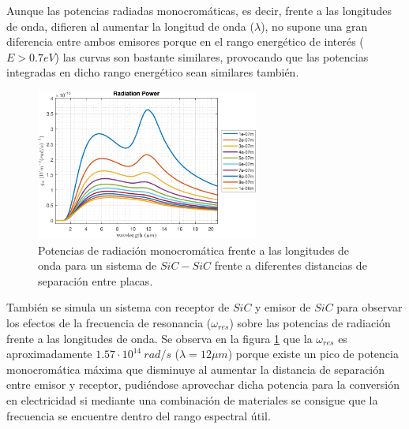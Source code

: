 Aunque las potencias radiadas monocromáticas, es decir, frente a las longitudes de onda, difieren al aumentar la longitud de onda ($\lambda$), no supone una gran diferencia entre ambos emisores porque en el rango energético de interés ($E>0.7eV$) las curvas son bastante similares, provocando que las potencias integradas en dicho rango energético sean similares también.
\begin{figure}[H]
	\centering
		\includegraphics[width=0.65\textwidth]{figuras/Resultados/radiacion/SiCSiC.pdf}
	\caption{Potencias de radiación monocromática frente a las longitudes de onda para un sistema de $SiC-SiC$ frente a diferentes distancias de separación entre placas.}
	\label{fig:SiCSiC}
\end{figure}
También se simula un sistema con receptor de $SiC$ y emisor de $SiC$ para observar los efectos de la frecuencia de resonancia ($\omega_{res}$) sobre las potencias de radiación frente a las longitudes de onda. Se observa en la figura \ref{fig:SiCSiC} que la $\omega_{res}$ es aproximadamente $1.57\cdot 10^{14} \ rad/s$ ($\lambda = 12\mu m$) porque existe un pico de potencia monocromática máxima que disminuye al aumentar la distancia de separación entre emisor y receptor, pudiéndose aprovechar dicha potencia para la conversión en electricidad si mediante una combinación de materiales se consigue que la frecuencia se encuentre dentro del rango espectral útil.

